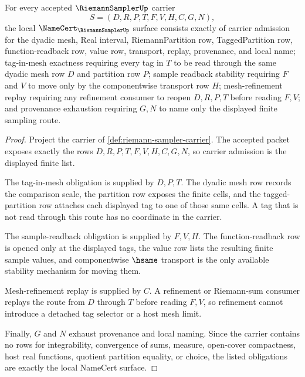 \begin{theorem}
\label{thm:riemann-sampler-namecert-obligations}
For every accepted $\RiemannSamplerUp$ carrier
$$
S=(D,R,P,T,F,V,H,C,G,N),
$$
the local $\NameCert_{\RiemannSamplerUp}$ surface consists exactly of carrier admission for the dyadic mesh, Real interval, RiemannPartition row, TaggedPartition row, function-readback row, value row, transport, replay, provenance, and local name; tag-in-mesh exactness requiring every tag in $T$ to be read through the same dyadic mesh row $D$ and partition row $P$; sample readback stability requiring $F$ and $V$ to move only by the componentwise transport row $H$; mesh-refinement replay requiring any refinement consumer to reopen $D,R,P,T$ before reading $F,V$; and provenance exhaustion requiring $G,N$ to name only the displayed finite sampling route.
\end{theorem}
\begin{proof}
Project the carrier of \autoref{def:riemann-sampler-carrier}. The accepted packet exposes exactly the rows $D,R,P,T,F,V,H,C,G,N$, so carrier admission is the displayed finite list.

The tag-in-mesh obligation is supplied by $D,P,T$. The dyadic mesh row records the comparison scale, the partition row exposes the finite cells, and the tagged-partition row attaches each displayed tag to one of those same cells. A tag that is not read through this route has no coordinate in the carrier.

The sample-readback obligation is supplied by $F,V,H$. The function-readback row is opened only at the displayed tags, the value row lists the resulting finite sample values, and componentwise $\hsame$ transport is the only available stability mechanism for moving them.

Mesh-refinement replay is supplied by $C$. A refinement or Riemann-sum consumer replays the route from $D$ through $T$ before reading $F,V$, so refinement cannot introduce a detached tag selector or a host mesh limit.

Finally, $G$ and $N$ exhaust provenance and local naming. Since the carrier contains no rows for integrability, convergence of sums, measure, open-cover compactness, host real functions, quotient partition equality, or choice, the listed obligations are exactly the local NameCert surface.
\end{proof}


